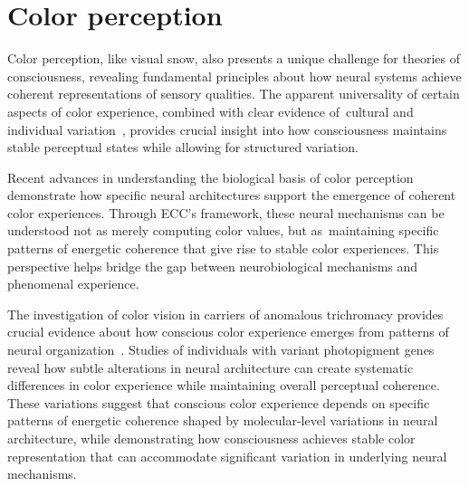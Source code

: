 \section{Color perception}

Color perception, like visual snow, also presents a unique challenge for theories of consciousness, revealing fundamental principles about how neural systems achieve coherent representations of sensory qualities. The apparent universality of certain aspects of color experience, combined with clear evidence of~cultural and individual variation~\cite{Davidoff2015, pinotsis2023cytoelectric}, provides crucial insight into how consciousness maintains stable perceptual states while allowing for structured variation.

Recent advances in understanding the biological basis of color perception~\cite{ConwayLivingstone2021, kukushkin2024massed} demonstrate how specific neural architectures support the emergence of coherent color experiences. Through ECC's framework, these neural mechanisms can be understood not as merely computing color values, but as~maintaining specific patterns of energetic coherence that give rise to stable color experiences. This perspective helps bridge the gap between neurobiological mechanisms and phenomenal experience.

The investigation of color vision in carriers of anomalous trichromacy provides crucial evidence about how conscious color experience emerges from patterns of neural organization~\cite{JordanMollon1993, bosl2025dynamical}. Studies of individuals with variant photopigment genes~\cite{Jordan2010, kukushkin2024massed} reveal how subtle alterations in neural architecture can create systematic differences in color experience while maintaining overall perceptual coherence. These variations suggest that conscious color experience depends on specific patterns of energetic coherence shaped by molecular-level variations in neural architecture, while demonstrating how consciousness achieves stable color representation that can accommodate significant variation in underlying neural mechanisms.

